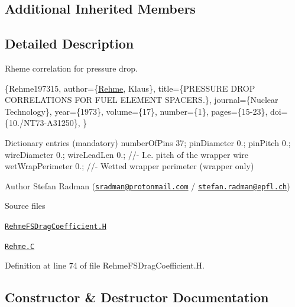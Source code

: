 \subsection*{Additional Inherited Members}


\subsection{Detailed Description}
Rheme correlation for pressure drop. 

\label{_Description}%
 \{Rehme197315, author=\{\hyperlink{classFoam_1_1FSDragCoefficientModels_1_1Rehme}{Rehme}, Klaus\}, title=\{P\+R\+E\+S\+S\+U\+RE D\+R\+OP C\+O\+R\+R\+E\+L\+A\+T\+I\+O\+NS F\+OR F\+U\+EL E\+L\+E\+M\+E\+NT S\+P\+A\+C\+E\+RS.\}, journal=\{Nuclear Technology\}, year=\{1973\}, volume=\{17\}, number=\{1\}, pages=\{15-\/23\}, doi=\{10./\+N\+T73-\/\+A31250\}, \}

Dictionary entries (mandatory) number\+Of\+Pins 37; pin\+Diameter 0.; pin\+Pitch 0.; wire\+Diameter 0.; wire\+Lead\+Len 0.; //-\/ I.\+e. pitch of the wrapper wire wet\+Wrap\+Perimeter 0.; //-\/ Wetted wrapper perimeter (wrapper only)

Author Stefan Radman (\href{mailto:sradman@protonmail.com}{\tt sradman@protonmail.\+com} / \href{mailto:stefan.radman@epfl.ch}{\tt stefan.\+radman@epfl.\+ch})

\begin{DoxyParagraph}{Source files}

\begin{DoxyItemize}
\item \href{../../../home/carlo/data/GeN-Foam/GeN-Foam_ffn/GeN-Foam/GeN-Foam/classes/thermalHydraulics/src/physicsModels/dragModels/FSDragCoefficientModels/Rehme/RehmeFSDragCoefficient.H}{\tt Rehme\+F\+S\+Drag\+Coefficient.\+H} 
\item \href{../../../home/carlo/data/GeN-Foam/GeN-Foam_ffn/GeN-Foam/GeN-Foam/classes/thermalHydraulics/src/physicsModels/dragModels/FSDragCoefficientModels/Rehme/Rehme.C}{\tt Rehme.\+C} 
\end{DoxyItemize}
\end{DoxyParagraph}


Definition at line 74 of file Rehme\+F\+S\+Drag\+Coefficient.\+H.



\subsection{Constructor \& Destructor Documentation}
\mbox{\label{classFoam_1_1FSDragCoefficientModels_1_1Rehme_a786840458937af5f59368fbea3e63268}} 
